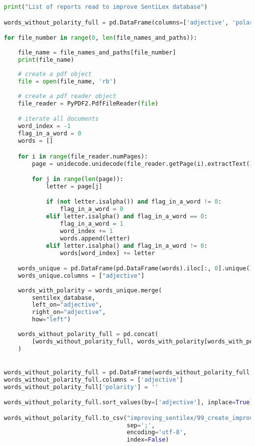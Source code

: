 \begin{lstlisting}[language=Python]
print("List of reports read to improve SentiLex database")

words_without_polarity_full = pd.DataFrame(columns=['adjective', 'polarity'])

for file_number in range(0, len(file_names_and_paths)):
    
    file_name = file_names_and_paths[file_number]
    print(file_name)
    
    # create a pdf object
    file = open(file_name, 'rb')
    
    # create a pdf reader object
    file_reader = PyPDF2.PdfFileReader(file)

    # iterate all documents
    word_index = -1
    flag_in_a_word = 0
    words = []

    for i in range(file_reader.numPages):
        page = unidecode.unidecode(file_reader.getPage(i).extractText().lower())

        for j in range(len(page)):
            letter = page[j]

            if (not letter.isalpha()) and flag_in_a_word != 0:
                flag_in_a_word = 0
            elif letter.isalpha() and flag_in_a_word == 0:
                flag_in_a_word = 1
                word_index += 1
                words.append(letter)
            elif letter.isalpha() and flag_in_a_word != 0:
                words[word_index] += letter

    words_unique = pd.DataFrame(pd.DataFrame(words).iloc[:, 0].unique())
    words_unique.columns = ["adjective"]
    
    words_with_polarity = words_unique.merge(
        sentilex_database,
        left_on="adjective",
        right_on="adjective",
        how="left")
    
    words_without_polarity_full = pd.concat(
        [words_without_polarity_full, words_with_polarity[words_with_polarity.polarity.isnull()]]
    )


words_without_polarity_full = pd.DataFrame(words_without_polarity_full.adjective.unique())
words_without_polarity_full.columns = ['adjective']
words_without_polarity_full['polarity'] = ''

words_without_polarity_full.sort_values(by=['adjective'], inplace=True)

words_without_polarity_full.to_csv("improving_sentilex/99_create_improving_sentilex.csv",
                                   sep=';',
                                   encoding='utf-8',
                                   index=False)
\end{lstlisting}
